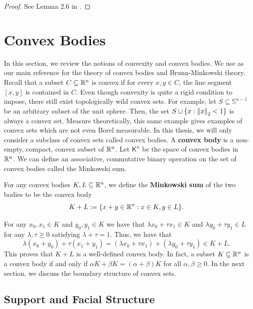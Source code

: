 \documentclass{puthesis-UG}
\begin{document}
\begin{proof}
	See Lemma 2.6 in \cite{bochner}. 
\end{proof}

\section{Convex Bodies} \label{sec:convex-bodies}

In this section, we review the notions of convexity and convex bodies. We use \cite{schneider_2013} as our main reference for the theory of convex bodies and Brunn-Minkowski theory. Recall that a subset $C \subseteq \mathbb{R}^n$ is convex if for every $x, y \in C$, the line segment $[x, y]$ is contained in $C$. Even though convexity is quite a rigid condition to impose, there still exist topologically wild convex sets. For example, let $S \subseteq \mathbb{S}^{n-1}$ be an arbitrary subset of the unit sphere. Then, the set $S \cup \{x : \left\lVert x\right\rVert_2 < 1\}$ is always a convex set. Measure theoretically, this same example gives examples of convex sets which are not even Borel measurable. In this thesis, we will only consider a subclass of convex sets called convex bodies. A \textbf{convex body} is a non-empty, compact, convex subset of $\mathbb{R}^n$. Let $\mathsf{K}^n$ be the space of convex bodies in $\mathbb{R}^n$. We can define an associative, commutative binary operation on the set of convex bodies called the Minkowski sum. 

\begin{defn}
	For any convex bodies $K, L \subseteq \mathbb{R}^n$, we define the \textbf{Minkowski sum} of the two bodies to be the convex body
	\[
		K + L := \{x + y \in \mathbb{R}^n : x \in K, y \in L\}.
	\]
\end{defn}

For any $x_0, x_1 \in K$ and $y_0, y_1 \in K$ we have that $\lambda x_0 + \tau x_1 \in K$ and $\lambda y_0 + \tau y_1 \in L$ for any $\lambda, \tau \geq 0$ satisfying $\lambda + \tau = 1$. Thus, we have that 
\[
	\lambda (x_0 + y_0) + \tau (x_1 + y_1) = (\lambda x_0 + \tau x_1) + (\lambda y_0 + \tau y_1) \in K + L.
\]
This proves that $K + L$ is a well-defined convex body. In fact, a subset $K \subseteq \mathbb{R}^n$ is a convex body if and only if $\alpha K + \beta K = (\alpha + \beta) K$ for all $\alpha, \beta \geq 0$. In the next section, we discuss the boundary structure of convex sets.  

\subsection{Support and Facial Structure}
\end{document}
